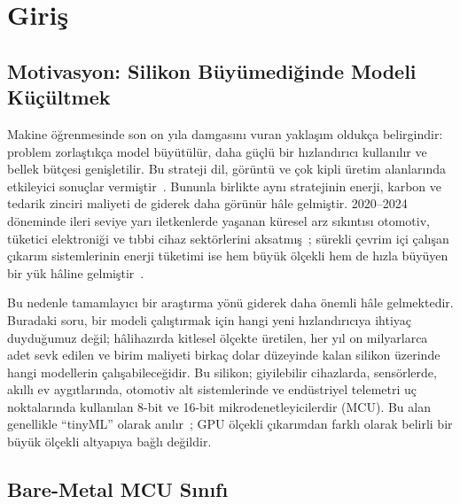 \section{Giriş}
\label{sec:intro}

\subsection{Motivasyon: Silikon Büyümediğinde Modeli Küçültmek}

Makine öğrenmesinde son on yıla damgasını vuran yaklaşım oldukça
belirgindir: problem zorlaştıkça model büyütülür, daha güçlü bir
hızlandırıcı kullanılır ve bellek bütçesi genişletilir. Bu strateji
dil, görüntü ve çok kipli üretim alanlarında etkileyici sonuçlar
vermiştir~\cite{patterson2021carbon}. Bununla birlikte aynı
stratejinin enerji, karbon ve tedarik zinciri maliyeti de giderek
daha görünür hâle gelmiştir. 2020--2024 döneminde ileri seviye yarı
iletkenlerde yaşanan küresel arz sıkıntısı otomotiv, tüketici
elektroniği ve tıbbi cihaz sektörlerini
aksatmış~\cite{burkacky2022chipshortage,khan2021chipshortage};
sürekli çevrim içi çalışan çıkarım sistemlerinin enerji tüketimi ise
hem büyük ölçekli hem de hızla büyüyen bir yük hâline
gelmiştir~\cite{strubell2019energy,patterson2021carbon}.

Bu nedenle tamamlayıcı bir araştırma yönü giderek daha önemli hâle
gelmektedir. Buradaki soru, bir modeli çalıştırmak için hangi yeni
hızlandırıcıya ihtiyaç duyduğumuz değil; hâlihazırda kitlesel
ölçekte üretilen, her yıl on milyarlarca adet sevk edilen ve birim
maliyeti birkaç dolar düzeyinde kalan silikon üzerinde hangi
modellerin çalışabileceğidir. Bu silikon; giyilebilir cihazlarda,
sensörlerde, akıllı ev aygıtlarında, otomotiv alt sistemlerinde ve
endüstriyel telemetri uç noktalarında kullanılan 8-bit ve 16-bit
mikrodenetleyicilerdir (MCU). Bu alan genellikle ``tinyML''
olarak anılır~\cite{banbury2021mlperf}; GPU ölçekli çıkarımdan
farklı olarak belirli bir büyük ölçekli altyapıya bağlı değildir.

\subsection{Bare-Metal MCU Sınıfı}

